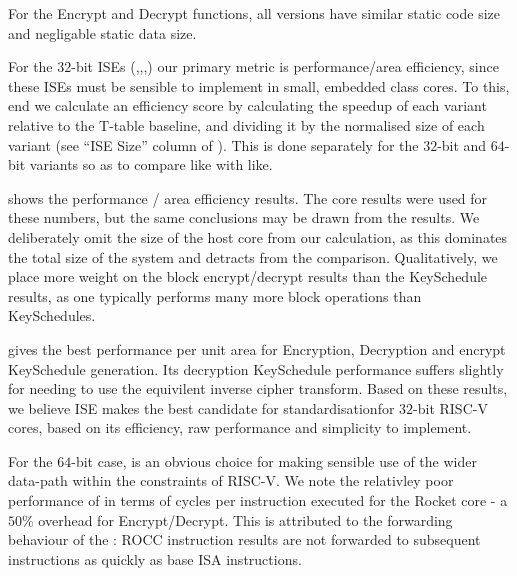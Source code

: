 For the Encrypt and Decrypt functions, all versions have similar
static code size and negligable static data size.

For the $32$-bit ISEs 
(,,,)
our primary metric is
performance/area efficiency, since these ISEs must be sensible to
implement in small, embedded class cores.
To this, end we calculate an efficiency score by calculating the speedup
of each variant relative to the T-table baseline, and dividing it
by the normalised size of each variant
(see ``ISE Size'' column of ).
This is done separately for the $32$-bit and $64$-bit variants so as
to compare like with like.

 shows the performance / area efficiency results.
The  core results were used for these numbers, but the
same conclusions may be drawn from the  results.
We deliberately omit the size of the host core from our calculation,
as this dominates the total size of the system and detracts from
the comparison.
Qualitatively, we place more weight on the block encrypt/decrypt results
than the KeySchedule results, as one typically performs many more
block operations than KeySchedules.

 gives the best performance per unit area
for Encryption, Decryption and encrypt KeySchedule generation.
Its decryption KeySchedule performance suffers slightly for needing
to use the equivilent inverse cipher transform.
Based on these results, we believe ISE  makes the best candidate for
standardisationfor $32$-bit RISC-V cores,
based on its efficiency, raw performance and simplicity to implement.

For the $64$-bit case,  is an obvious choice for making
sensible use of the wider data-path within the constraints of RISC-V.
We note the relativley poor performance of  in terms of cycles
per instruction executed for the Rocket core - a $50\%$ overhead for
Encrypt/Decrypt.
This is attributed to the forwarding behaviour of the :
ROCC instruction results are not
forwarded to subsequent instructions as quickly as base ISA
instructions.

